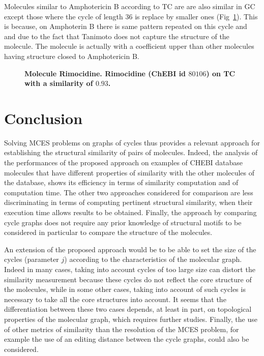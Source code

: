 \documentclass[10pt,letterpaper]{article}
\begin{document}
Molecules similar to Amphotericin B according to TC are are also similar in GC except those where the cycle of length $36$ is replace by smaller ones (Fig~\ref{fig15}). This is because, on Amphoterin B there is same pattern repeated on this cycle and and due to the fact that Tanimoto does not capture the structure of the molecule. The molecule is actually with a coefficient upper than other molecules having structure closed to Amphotericin B.


\begin{figure}[!h]
	\caption{\bf{Molecule Rimocidine.}
	Rimocidine (ChEBI id $80106$) on TC with a similarity of $0.93$.}
	\label{fig15}
\end{figure}


\section*{Conclusion}

 Solving MCES problems on  graphs of cycles thus provides a relevant approach for establishing the structural similarity of pairs of molecules. Indeed,   the analysis of the performances of the proposed approach on examples of CHEBI database molecules that have different properties of similarity with the other molecules of the database, shows its efficiency in terms of similarity computation and of computation time. The other two approaches considered for comparison are less discriminating in terms of computing pertinent structural similarity, when their execution time allows results to be obtained. Finally, the approach by comparing cycle graphs does not require any prior knowledge of structural motifs to be considered in particular to compare the structure of the molecules.

An extension of the proposed approach would be to be able to set the size of the cycles (parameter $j$) according to the characteristics of the molecular graph. Indeed in many cases, taking into account cycles of too large size can distort the similarity measurement because these cycles do not reflect the core structure of the molecules, while in some other cases, taking into account of such cycles is necessary to take all the core structures into account. It seems that the differentiation between these two cases depends, at least in part, on topological properties of the molecular graph, which requires further studies. Finally, the use of other metrics of similarity than the resolution of the MCES problem, for example the use of an editing distance between the cycle graphs, could also be considered. 
\end{document}
